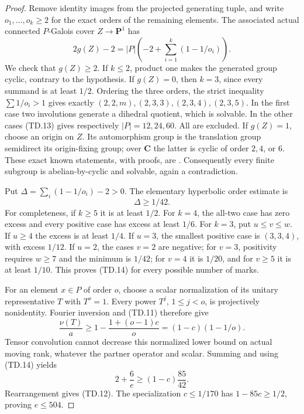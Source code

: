 \begin{proof}
Remove identity images from the projected generating tuple, and
write \(o_1,\ldots,o_k\ge2\) for the exact orders of the remaining
elements.  The associated actual connected \(P\)-Galois cover
\(Z\longrightarrow\mathbf P^1\) has
\[
 2g(Z)-2=|P|\left(-2+\sum_{i=1}^k(1-1/o_i)\right).
 \tag{TD.13}
\]
We check that \(g(Z)\ge2\).  If \(k\le2\), product one makes
the generated group cyclic, contrary to the hypothesis.
If \(g(Z)=0\), then \(k=3\), since every summand is at least
\(1/2\).  Ordering the three orders, the strict inequality
\(\sum1/o_i>1\) gives exactly
\((2,2,m),(2,3,3),(2,3,4),(2,3,5)\).
In the first case two involutions generate a dihedral quotient,
which is solvable.  In the other cases (TD.13) gives respectively
\(|P|=12,24,60\).  All are excluded.
If \(g(Z)=1\), choose an origin on \(Z\).  Its automorphism group
is the translation group semidirect its origin-fixing group;
over \(\mathbf C\) the latter is cyclic of order \(2,4\), or \(6\).
These exact known statements, with proofs, are
\cite[ChapterIV, Proposition7.13 and Remark7.18, pp.~140--141]{TD:MilneEC2021}.
Consequently every finite subgroup is abelian-by-cyclic and solvable,
again a contradiction.

Put \(\Delta=\sum_i(1-1/o_i)-2>0\).
The elementary hyperbolic order estimate is
\[
                         \Delta\ge1/42 .
                         \tag{TD.14}
\]
For completeness, if \(k\ge5\) it is at least \(1/2\).
For \(k=4\), the all-two case has zero excess and every positive
case has excess at least \(1/6\).
For \(k=3\), put \(u\le v\le w\).
If \(u\ge4\) the excess is at least \(1/4\).
If \(u=3\), the smallest positive case is \((3,3,4)\),
with excess \(1/12\).
If \(u=2\), the cases \(v=2\) are negative; for \(v=3\),
positivity requires \(w\ge7\) and the minimum is \(1/42\);
for \(v=4\) it is \(1/20\), and for \(v\ge5\) it is at least
\(1/10\).  This proves (TD.14) for every possible number of marks.

For an element \(x\in P\) of order \(o\), choose a scalar
normalization of its unitary representative \(T\) with \(T^o=1\).
Every power \(T^j\), \(1\le j<o\), is projectively nonidentity.
Fourier inversion and (TD.11) therefore give
\[
 \frac{\nu(T)}a
 \ge1-\frac{1+(o-1)c}{o}
                    =(1-c)(1-1/o).
 \tag{TD.15}
\]
Tensor convolution cannot decrease this normalized lower bound
on actual moving rank, whatever the partner operator and scalar.
Summing and using (TD.14) yields
\[
             2+\frac6e\ge(1-c)\frac{85}{42}.
             \tag{TD.16}
\]
Rearrangement gives (TD.12).  The specialization \(c\le1/170\)
has \(1-85c\ge1/2\), proving \(e\le504\).
\end{proof}

